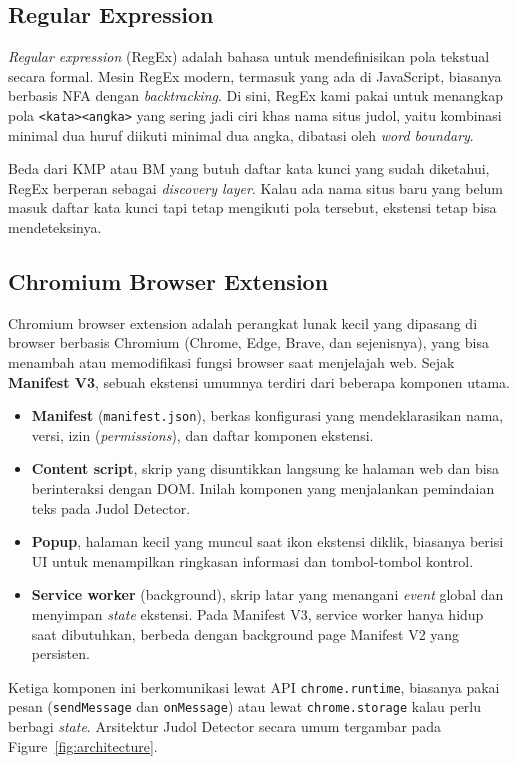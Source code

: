 \documentclass[11pt,a4paper]{article}
\begin{document}
\subsection{Regular Expression}
\textit{Regular expression} (RegEx) adalah bahasa untuk mendefinisikan pola tekstual secara formal. Mesin RegEx modern, termasuk
yang ada di JavaScript, biasanya berbasis NFA dengan \textit{backtracking}. Di sini, RegEx kami pakai untuk menangkap pola
\texttt{<kata><angka>} yang sering jadi ciri khas nama situs judol, yaitu kombinasi minimal dua huruf diikuti minimal dua angka,
dibatasi oleh \textit{word boundary}.

Beda dari KMP atau BM yang butuh daftar kata kunci yang sudah diketahui, RegEx berperan sebagai \textit{discovery layer}. Kalau
ada nama situs baru yang belum masuk daftar kata kunci tapi tetap mengikuti pola tersebut, ekstensi tetap bisa mendeteksinya.

\subsection{Chromium Browser Extension}
Chromium browser extension adalah perangkat lunak kecil yang dipasang di browser berbasis Chromium (Chrome, Edge, Brave, dan
sejenisnya), yang bisa menambah atau memodifikasi fungsi browser saat menjelajah web. Sejak \textbf{Manifest V3}, sebuah ekstensi
umumnya terdiri dari beberapa komponen utama.

\begin{itemize}
    \item \textbf{Manifest} (\texttt{manifest.json}), berkas konfigurasi yang mendeklarasikan nama, versi, izin
    (\textit{permissions}), dan daftar komponen ekstensi.
    \item \textbf{Content script}, skrip yang disuntikkan langsung ke halaman web dan bisa berinteraksi dengan DOM. Inilah
    komponen yang menjalankan pemindaian teks pada Judol Detector.
    \item \textbf{Popup}, halaman kecil yang muncul saat ikon ekstensi diklik, biasanya berisi UI untuk menampilkan ringkasan
    informasi dan tombol-tombol kontrol.
    \item \textbf{Service worker} (background), skrip latar yang menangani \textit{event} global dan menyimpan \textit{state}
    ekstensi. Pada Manifest V3, service worker hanya hidup saat dibutuhkan, berbeda dengan background page Manifest V2 yang persisten.
\end{itemize}

Ketiga komponen ini berkomunikasi lewat API \texttt{chrome.runtime}, biasanya pakai pesan (\texttt{sendMessage} dan
\texttt{onMessage}) atau lewat \texttt{chrome.storage} kalau perlu berbagi \textit{state}. Arsitektur Judol Detector secara umum
tergambar pada Figure~\ref{fig:architecture}.
\end{document}
